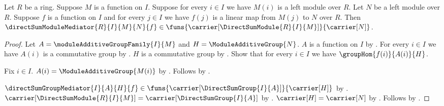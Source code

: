 \begin{proposition}\label{direct_sum_module_mediator_type}
    Let $R$ be a ring.
    Suppose $M$ is a function on $I$.
    Suppose for every $i\in I$ we have $M(i)$ is a left module over $R$.
    Let $N$ be a left module over $R$.
    Suppose $f$ is a function on $I$ and for every $j\in I$ we have
        $f(j)$ is a linear map from $M(j)$ to $N$ over $R$.
    Then $\directSumModuleMediator{R}{I}{M}{N}{f}\in
        \funs{\carrier[\DirectSumModule{R}{I}{M}]}{\carrier[N]}$.
\end{proposition}
\begin{proof}
    Let $A=\moduleAdditiveGroupFamily{I}{M}$ and
        $H=\ModuleAdditiveGroup{N}$.
    $A$ is a function on $I$ by
        .
    For every $i\in I$ we have $A(i)$ is a commutative group by
        .
    $H$ is a commutative group by
        .
    Show that for every $i\in I$ we have $\groupHom{f(i)}{A(i)}{H}$.
    \begin{subproof}
        Fix $i\in I$.
        $A(i)=\ModuleAdditiveGroup{M(i)}$ by
            .
        Follows by .
    \end{subproof}
    $\directSumGroupMediator{I}{A}{H}{f}\in
        \funs{\carrier[\DirectSumGroup{I}{A}]}{\carrier[H]}$ by
        .
    $\carrier[\DirectSumModule{R}{I}{M}]
        =\carrier[\DirectSumGroup{I}{A}]$ by
        .
    $\carrier[H]=\carrier[N]$ by
        .
    Follows by .
\end{proof}

